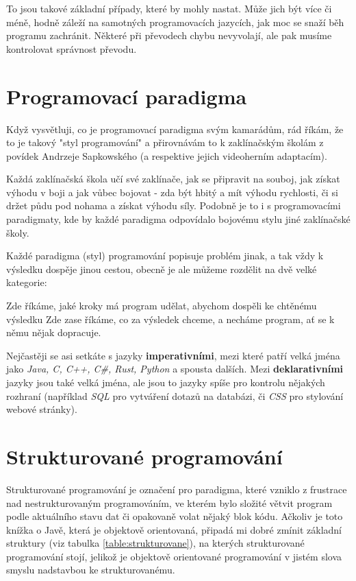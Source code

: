 To jsou takové základní případy, které by mohly nastat. Může jich být více či méně, hodně záleží na samotných programovacích jazycích, jak moc se snaží běh programu zachránit. Některé při převodech chybu nevyvolají, ale pak musíme kontrolovat správnost převodu.

\section{Programovací paradigma}

Když vysvětluji, co je programovací paradigma svým kamarádům, rád říkám, že to je takový "styl programování" a přirovnávám to k zaklínačským školám z povídek Andrzeje Sapkowského (a respektive jejich videoherním adaptacím). 

Každá zaklínačská škola učí své zaklínače, jak se připravit na souboj, jak získat výhodu v boji a jak vůbec bojovat - zda být hbitý a mít výhodu rychlosti, či si držet půdu pod nohama a získat výhodu síly. Podobně je to i s programovacími paradigmaty, kde by každé paradigma odpovídalo bojovému stylu jiné zaklínačské školy.

Každé paradigma (styl) programování popisuje problém jinak, a tak vždy k výsledku dospěje jinou cestou, obecně je ale můžeme rozdělit na dvě velké kategorie:
\begin{enumerate}
	 Zde říkáme, jaké kroky má program udělat, abychom dospěli ke chtěnému výsledku
	 Zde zase říkáme, co za výsledek chceme, a necháme program, ať se k němu nějak dopracuje.
\end{enumerate}

Nejčastěji se asi setkáte s jazyky \textbf{imperativními}, mezi které patří velká jména jako \textit{Java, C, C++, C\#, Rust, Python} a spousta dalších. Mezi \textbf{deklarativními} jazyky jsou také velká jména, ale jsou to jazyky spíše pro kontrolu nějakých rozhraní (například \textit{SQL} pro vytváření dotazů na databázi, či \textit{CSS} pro stylování webové stránky).

\section{Strukturované programování}

Strukturované programování je označení pro paradigma, které vzniklo z frustrace nad nestrukturovaným programováním, ve kterém bylo složité větvit program podle aktuálního stavu dat či opakovaně volat nějaký blok kódu. Ačkoliv je toto knížka o Javě, která je objektově orientovaná, připadá mi dobré zmínit základní struktury (viz tabulka \ref{table:strukturovane}), na kterých strukturované programování stojí, jelikož je objektově orientované programování v jistém slova smyslu nadstavbou ke strukturovanému.

